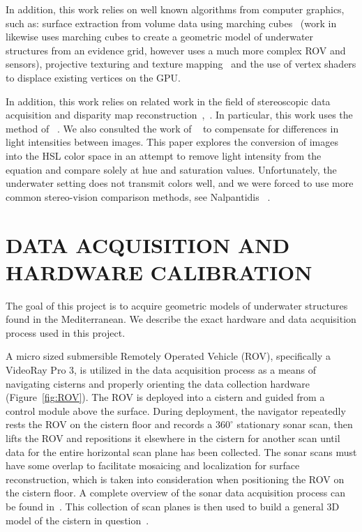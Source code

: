 \documentclass[a4paper,twoside]{article}
\begin{document}
In addition, this work relies on well known algorithms from computer graphics, such as: surface extraction from volume data using marching cubes~\cite{Lorensen} (work in ~\cite{Fairfield:2010} likewise uses marching cubes to create a geometric model of underwater structures from an evidence grid, however uses a much more complex ROV and sensors), projective texturing and texture mapping~\cite{Williams78castingcurved,Segal} and the use of vertex shaders to displace existing vertices on the GPU.

In addition, this work relies on related work in the field of stereoscopic data acquisition and disparity map reconstruction~\cite{stereo:gutMarroquin},~\cite{stereo:scharsteinSzeliski}.
  In particular, this work uses the method of ~\cite{stereo:zitKan}.
  We also consulted the work of ~\cite{stereo:nalGast} to compensate for differences in light intensities between images.
  This paper explores the conversion of images into the HSL color space in an attempt to remove light intensity from the equation and compare solely at hue and saturation values.
  Unfortunately, the underwater setting does not transmit colors well, and we were forced to use more common stereo-vision comparison methods, see Nalpantidis ~\cite{stereo:nalpantidis2008review}. 

\section{\uppercase{Data Acquisition and Hardware Calibration}}
\label{sec:data}

\noindent The goal of this project is to acquire geometric models of underwater structures found in the Mediterranean.  We describe the exact hardware and data acquisition process used in this project.

A micro sized submersible Remotely Operated Vehicle (ROV), specifically a VideoRay Pro 3, is utilized in the data acquisition process as a means of navigating cisterns and properly orienting the data collection hardware (Figure~\ref{fig:ROV}). The ROV is deployed into a cistern and guided from a control module above the surface. During deployment, the navigator repeatedly rests the ROV on the cistern floor and records a $360^{\circ}$ stationary sonar scan, then lifts the ROV and repositions it elsewhere in the cistern for another scan until data for the entire horizontal scan plane has been collected. The sonar scans must have some overlap to facilitate mosaicing and localization for surface reconstruction, which is taken into consideration when positioning the ROV on the cistern floor. A complete overview of the sonar data acquisition process can be found in~\cite{ClarkVast}.  This collection of scan planes is then used to build a general 3D model of the cistern in question~\cite{ICEX11}.
  
\end{document}
